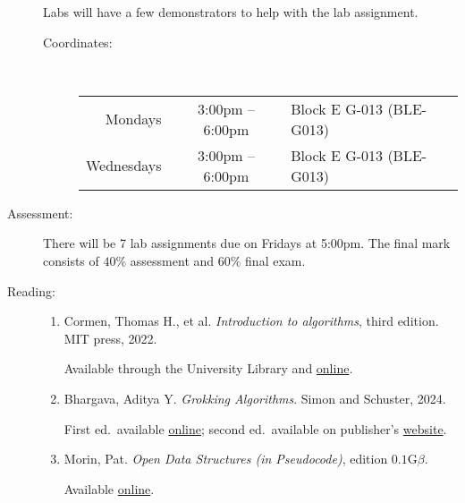 \documentclass[a4paper, 12pt]{article}
\begin{document}
\begin{description}
    Labs will have a few demonstrators to help with the lab assignment. 
    \begin{description}
      \item[Coordinates:] \hfill \\[0.5em]
      \begin{tabular}{rcl}
        Mondays & 3:00pm -- 6:00pm & Block E G-013 (BLE-G013) \\ Wednesdays & 3:00pm -- 6:00pm & Block E G-013 (BLE-G013)
      \end{tabular}
    \end{description}
    \vspace{1cm}
    \item[Assessment:] There will be 7 lab assignments due on Fridays at 5:00pm. The final mark consists of $40\%$ assessment and $60\%$ final exam.
    \vspace{1cm}
    \item[Reading:] \hfill 
    \begin{enumerate}
      \item Cormen, Thomas H., et al. \emph{Introduction to algorithms}, third edition. MIT press, 2022.
      
      Available through the University Library and \href{https://search.library.nuigalway.ie/permalink/f/1pmb9lf/353GAL_ALMA_DS2139494700003626}{online}.

      \item Bhargava, Aditya Y. \emph{Grokking Algorithms}. Simon and Schuster, 2024.
      
      First ed.\ available \href{https://edu.anarcho-copy.org/Algorithm/grokking-algorithms-illustrated-programmers-curious.pdf}{online}; second ed.\ available on publisher's \href{https://www.manning.com/books/grokking-algorithms}{website}.

      \item Morin, Pat. \emph{Open Data Structures (in Pseudocode)}, edition $0.1\text{G}\beta$.
      
      Available \href{https://opendatastructures.org/}{online}. 
    \end{enumerate}
\end{description}
\end{document}
